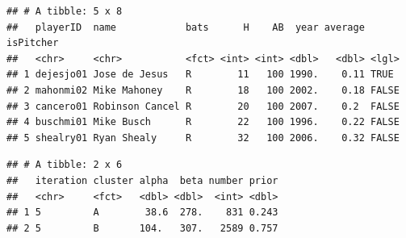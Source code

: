 \documentclass[]{book}
\newenvironment{Shaded}{\begin{snugshade}}{\end{snugshade}}
\newcommand{\CommentTok}[1]{\textcolor[rgb]{0.56,0.35,0.01}{\textit{#1}}}
\newcommand{\KeywordTok}[1]{\textcolor[rgb]{0.13,0.29,0.53}{\textbf{#1}}}
\newcommand{\NormalTok}[1]{#1}
\newcommand{\OperatorTok}[1]{\textcolor[rgb]{0.81,0.36,0.00}{\textbf{#1}}}
\newcommand{\StringTok}[1]{\textcolor[rgb]{0.31,0.60,0.02}{#1}}
\begin{document}
\begin{verbatim}
## # A tibble: 5 x 8
##   playerID  name            bats      H    AB  year average isPitcher
##   <chr>     <chr>           <fct> <int> <int> <dbl>   <dbl> <lgl>    
## 1 dejesjo01 Jose de Jesus   R        11   100 1990.    0.11 TRUE     
## 2 mahonmi02 Mike Mahoney    R        18   100 2002.    0.18 FALSE    
## 3 cancero01 Robinson Cancel R        20   100 2007.    0.2  FALSE    
## 4 buschmi01 Mike Busch      R        22   100 1996.    0.22 FALSE    
## 5 shealry01 Ryan Shealy     R        32   100 2006.    0.32 FALSE
\end{verbatim}

\begin{Shaded}
\end{Shaded}

\begin{verbatim}
## # A tibble: 2 x 6
##   iteration cluster alpha  beta number prior
##   <chr>     <fct>   <dbl> <dbl>  <int> <dbl>
## 1 5         A        38.6  278.    831 0.243
## 2 5         B       104.   307.   2589 0.757
\end{verbatim}
\end{document}
